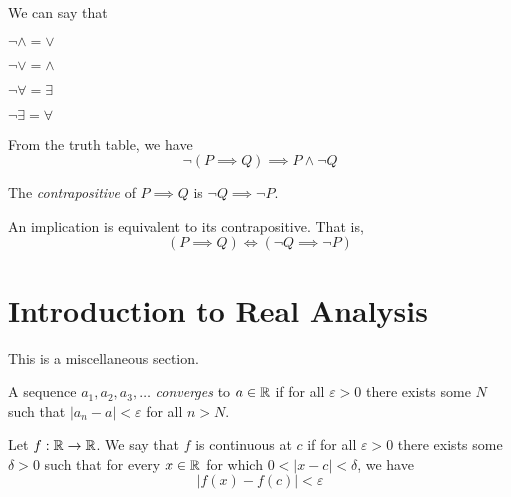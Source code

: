 \begin{named}[Note]
We can say that
\bitem
\item $\lnot \land = \lor$
\item $\lnot \lor = \land$
\item $\lnot \forall = \exists$
\item $\lnot \exists = \forall$
\eitem
\end{named}

From the truth table, we have 
$$\lnot (P \implies Q) \implies P \land \lnot Q$$

\begin{definition}
	The \emph{contrapositive} of $P \implies Q$ is $\lnot Q \implies \lnot P$.
\end{definition}

\begin{theorem}
	An implication is equivalent to its contrapositive. That is,
	$$(P \implies Q) \iff (\lnot Q \implies \lnot P)$$
\end{theorem}


\section*{Introduction to Real Analysis}

This is a miscellaneous section.

\begin{definition}
	A sequence $a_1, a_2, a_3, \ldots$ \emph{converges} to $a \in \mathbb{R}$ if for all $\varepsilon > 0$ there exists some $N$ such that $|a_n - a| < \varepsilon$ for all $n > N$.
\end{definition}

\begin{definition}
	Let $f : \mathbb{R} \rightarrow \mathbb{R}$. We say that $f$ is continuous at $c$ if for all $\varepsilon >0$ there exists some $\delta > 0$ such that for every $x \in \mathbb{R}$ for which $0 < |x - c| < \delta$, we have
	$$|f(x)-f(c)| < \varepsilon$$
\end{definition}

